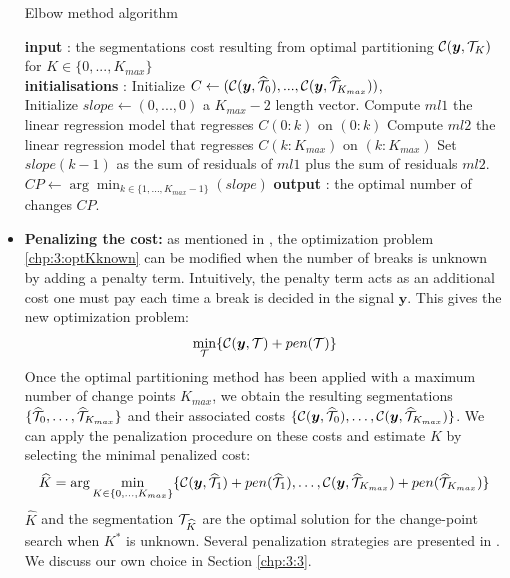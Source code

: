 \begin{itemize}
\begin{algorithm}[ht]
\caption{Elbow method algorithm}\label{chp:3:algoelbow}
\begin{algorithmic}
\State \textbf{input} : the segmentations cost resulting from optimal partitioning ${\mathcal C}(\bm y, {\mathcal T}_{K})$ for $K \in \{0,...,K_{max}\}$ \\
\State \textbf{initialisations} : Initialize $C \gets ({\mathcal C}(\bm y, \widehat{{\mathcal T}}_{0}),...,{\mathcal C}(\bm y, \widehat{{\mathcal T}}_{K_{max}}))$, \\
Initialize $slope \gets (0,...,0)$  a $K_{max}-2$ length vector. 
  \State Compute $ml1$ the linear regression model that regresses $C(0:k)$ on $(0:k)$
  \State Compute $ml2$ the linear regression model that regresses $C(k:K_{max})$ on $(k:K_{max})$
  \State Set $slope(k-1)$ as the sum of residuals of $ml1$ plus the sum of residuals $ml2$.
\EndFor
\State $CP \gets \arg\min_{k\in\{1,...,K_{max}-1\}}(slope)$
\State \textbf{output} : the optimal number of changes $CP$. 
\end{algorithmic}
\end{algorithm} 
\item \textbf{Penalizing the cost:} as mentioned in \cite{truong2020}, the optimization problem \eqref{chp:3:optKknown} can be modified when the number of breaks is unknown by adding a penalty term. Intuitively, the penalty term acts as an additional cost one must pay each time a break is decided in the signal $\bm y$. This gives the new optimization problem: 
\begin{equation}\label{chp:3:optKnknown}
\min_{{\mathcal T}} \{ \mathcal{C}(\bm y,{\mathcal T}) + pen({\mathcal T}) \} 
\end{equation}   
Once the optimal partitioning method has been applied with a maximum number of change points $K_{max}$, we obtain the resulting segmentations $\{\widehat{{\mathcal T}}_0,\dots,\widehat{{\mathcal T}}_{K_{max}}\}$ and their associated costs $\{{\mathcal C}(\bm y, \widehat{{\mathcal T}}_0),\dots,{\mathcal C}(\bm y, \widehat{{\mathcal T}}_{K_{max}})\}$. We can apply the penalization procedure on these costs and estimate $K$ by selecting the minimal penalized cost:
\begin{equation}\label{chp:3:Khat}
\widehat{K} = \arg\min_{K \in \{0,\dots,K_{max}\}} \{{\mathcal C}(\bm y, \widehat{{\mathcal T}}_1)+pen(\widehat{{\mathcal T}}_1),\dots,{\mathcal C}(\bm y, \widehat{{\mathcal T}}_{K_{max}})+pen(\widehat{{\mathcal T}}_{K_{max}})\} 
\end{equation}
$\widehat{K}$ and the segmentation ${\mathcal T}_{\widehat{K}}$ are the optimal solution for the change-point search when $K^*$ is unknown. Several penalization strategies are presented in \cite{truong2020}. We discuss our own choice in Section \ref{chp:3:3}.  
\end{itemize}    

